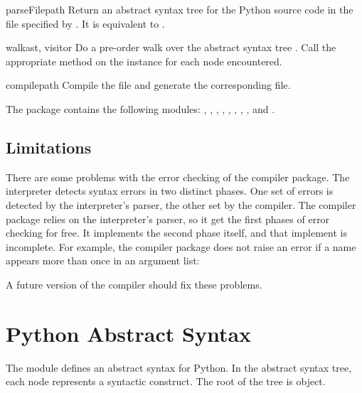 \begin{funcdesc}{parseFile}{path}
Return an abstract syntax tree for the Python source code in the file
specified by .  It is equivalent to
.
\end{funcdesc}

\begin{funcdesc}{walk}{ast, visitor}
Do a pre-order walk over the abstract syntax tree .  Call the
appropriate method on the  instance for each node
encountered.
\end{funcdesc}

\begin{funcdesc}{compile}{path}
Compile the file  and generate the corresponding 
file.
\end{funcdesc}

The  package contains the following modules:
, , ,
, , , ,
, and .

\subsection{Limitations}

There are some problems with the error checking of the compiler
package.  The interpreter detects syntax errors in two distinct
phases.  One set of errors is detected by the interpreter's parser,
the other set by the compiler.  The compiler package relies on the
interpreter's parser, so it get the first phases of error checking for
free.  It implements the second phase itself, and that implement is
incomplete.  For example, the compiler package does not raise an error
if a name appears more than once in an argument list: 

A future version of the compiler should fix these problems.

\section{Python Abstract Syntax}

The  module defines an abstract syntax for
Python.  In the abstract syntax tree, each node represents a syntactic
construct.  The root of the tree is  object.

